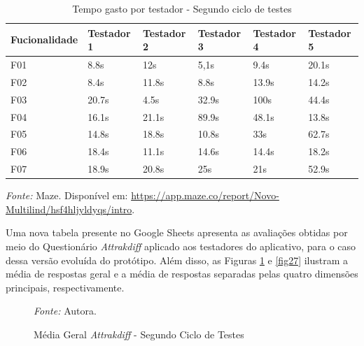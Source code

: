 \begin{table}[h!]
	\centering
	\caption{Tempo gasto por testador - Segundo ciclo de testes}
	\label{tab07}
	\begin{tabular}{l|l|l|l|l|l}
	\hline
	Fucionalidade & Testador 1 & Testador 2 & Testador 3 & Testador 4 & Testador 5 \\ 	\hline
	F01                   & 8.8s     & 12s     & 5,1s      & 9.4s       & 20.1s      \\
	F02                   & 8.4s        & 11.8s      & 8.8s      & 13.9s    & 14.2s     \\
	F03                   & 20.7s        & 4.5s      & 32.9s      & 100s     & 44.4s     \\
	F04                   & 16.1s        & 21.1s     & 89.9s     & 48.1s     & 13.8s     \\
	F05                   & 14.8s      & 18.8s      & 10.8s     & 33s     & 62.7s     \\
	F06                   & 18.4s     & 11.1s      & 14.6s     & 14.4s     & 18.2s     \\
	F07                   & 18.9s     & 20.8s      & 25s     & 21s    & 52.9s       \\ 	\hline
	\end{tabular}
	\begin{tablenotes}[flushleft]
		\centering
		\item \textit{Fonte:} Maze. Disponível em: \url{https://app.maze.co/report/Novo-Multilind/hsf4hljyldyqs/intro}.
	  \end{tablenotes}
\end{table}

Uma nova tabela presente no Google Sheets apresenta as avaliações obtidas por meio do Questionário \textit{Attrakdiff} aplicado aos testadores do aplicativo, para o caso dessa versão evoluída do protótipo. 
Além disso, as Figuras \ref{fig26} e \ref{fig27} ilustram a média de respostas geral e a média de respostas separadas pelas quatro dimensões principais, respectivamente.

\begin{figure}[h!]
	\centering
	\caption{Média Geral \textit{Attrakdiff} - Segundo Ciclo de Testes}
	\begin{tablenotes}[flushleft]
		\centering
		\item \textit{Fonte:} Autora.
	\end{tablenotes}
	\label{fig26}
\end{figure}

